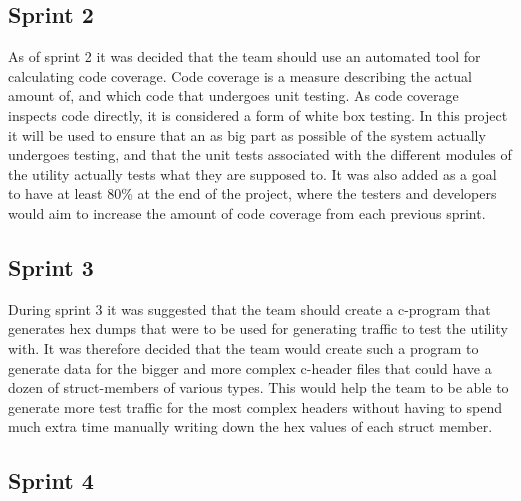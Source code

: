 \subsection{Sprint 2}
As of sprint 2 it was decided that the team should use an automated tool for calculating code coverage. Code coverage is a measure describing the actual amount of, and which code that undergoes unit testing. As code coverage inspects code directly, it is considered a form of white box testing. In this project it will be used to ensure that an as big part as possible of the system actually undergoes testing, and that the unit tests associated with the different modules of the \gls{utility} actually tests what they are supposed to. It was also added as a goal to have at least 80\% at the end of the project, where the testers and developers would aim to increase the amount of code coverage from each previous sprint.

\subsection{Sprint 3}
During sprint 3 it was suggested that the team should create a \Gls{c}-program that generates \glspl{hex dump} that were to be used for generating traffic to test the \gls{utility} with. It was therefore decided that the team would create such a program to generate data for the bigger and more complex \Gls{c}-\gls{header} files that could have a dozen of \gls{struct}-\glspl{member} of various types. This would help the team to be able to generate more test traffic for the most complex \glspl{header} without having to spend much extra time manually writing down the hex values of each \gls{struct} \gls{member}.

\subsection{Sprint 4}

